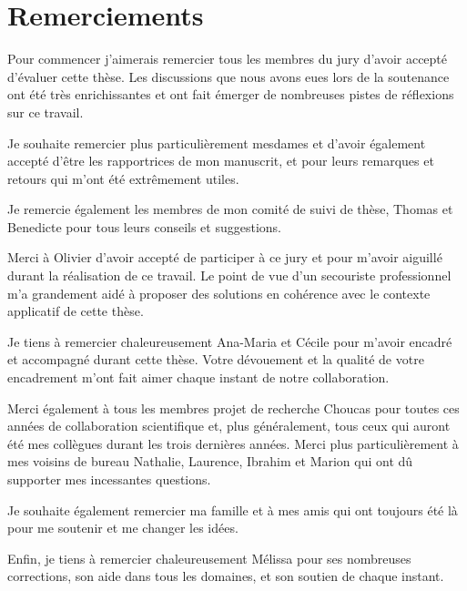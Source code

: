 \section*{Remerciements}

Pour commencer j'aimerais remercier tous les membres du jury d'avoir
accepté d'évaluer cette thèse. Les discussions que nous avons eues
lors de la soutenance ont été très enrichissantes et ont fait émerger
de nombreuses pistes de réflexions sur ce travail.

\vspace{.25cm}

Je souhaite remercier plus particulièrement mesdames
 et  d'avoir également accepté
d'être les rapportrices de mon manuscrit, et pour leurs remarques et
retours qui m'ont été extrêmement utiles.

\vspace{.25cm}

Je remercie également les membres de mon comité de suivi de thèse,
Thomas  et Benedicte  pour tous leurs
conseils et suggestions.

\vspace{.25cm}

Merci à Olivier  d'avoir accepté de participer à ce jury et
pour m'avoir aiguillé durant la réalisation de ce travail. Le point de
vue d'un secouriste professionnel m'a grandement aidé à proposer des
solutions en cohérence avec le contexte applicatif de cette thèse.

\vspace{.25cm}

Je tiens à remercier chaleureusement Ana-Maria 
et Cécile  pour m'avoir encadré et accompagné durant
cette thèse. Votre dévouement et la qualité de votre encadrement m'ont
fait aimer chaque instant de notre collaboration.  

\vspace{.25cm}

Merci également à tous les membres projet de recherche Choucas pour
toutes ces années de collaboration scientifique et, plus généralement,
tous ceux qui auront été mes collègues durant les trois dernières
années. Merci plus particulièrement à mes voisins de bureau Nathalie,
Laurence, Ibrahim et Marion qui ont dû supporter mes incessantes
questions.

\vspace{.25cm}

Je souhaite également remercier ma famille et à mes amis qui ont
toujours été là pour me soutenir et me changer les idées.

\vspace{.25cm}

Enfin, je tiens à remercier chaleureusement Mélissa pour ses
nombreuses corrections, son aide dans tous les domaines, et son
soutien de chaque instant.

